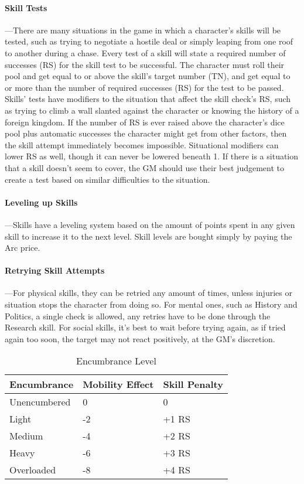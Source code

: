 \documentclass[oneside,11pt,english]{book}
\begin{document}
\paragraph{\label{par:Skill Tests}Skill Tests}
---\quad There are many situations in the game in which a character’s skills
will be tested, such as trying to negotiate a hostile deal or simply leaping
from one roof to another during a chase. Every test of a skill will state a
required number of successes (RS) for the skill test to be successful. The
character must roll their pool and get equal to or above the skill’s target
number (TN), and get equal to or more than the number of required successes (RS)
for the test to be passed. Skills’ tests have modifiers to the situation that
affect the skill check’s RS, such as trying to climb a wall slanted against the
character or knowing the history of a foreign kingdom. If the number of RS is
ever raised above the character’s dice pool plus automatic successes the
character might get from other factors, then the skill attempt immediately
becomes impossible. Situational modifiers can lower RS as well, though it can
never be lowered beneath 1. If there is a situation that a skill doesn’t seem to
cover, the GM should use their best judgement to create a test based on similar
difficulties to the situation. 

\paragraph{Leveling up Skills} 
---\quad Skills have a leveling system based on the amount of points spent in any given skill to increase it to the next level. Skill levels are bought simply by paying the Arc price.
\paragraph{Retrying Skill Attempts}
---\quad For physical skills, they can be retried any amount of times, unless
injuries or situation stops the character from doing so. For mental ones, such
as History and Politics, a single check is allowed, any retries have to be done
through the Research skill. For social skills, it’s best to wait before trying
again, as if tried again too soon, the target may not react positively, at the
GM’s discretion. 

\setlength{\intextsep}{0pt}
\vspace{-5pt}\begin{wraptable}{r}{8 cm}
  \centering
  \caption{Encumbrance Level}
  \label{tab:Encumbrance Penalties}
  \begin{tabu} spread 0pt{XX[c]X[r]}
    Encumbrance		&Mobility Effect&Skill Penalty\\\toprule
    Unencumbered	&0				&0\\
    Light			&-2				&+1 RS\\
    Medium			&-4				&+2 RS\\
    Heavy			&-6				&+3 RS\\
    Overloaded		&-8				&+4 RS\\
  \end{tabu}
\end{wraptable}
\setlength{\intextsep}{\oldintextsep}
\end{document}

